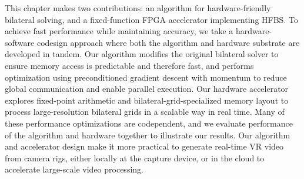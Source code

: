 This chapter makes two contributions: an algorithm for hardware-friendly bilateral solving, and a fixed-function FPGA accelerator implementing HFBS. 
To achieve fast performance while maintaining accuracy, we take a hardware-software codesign approach where both the algorithm and hardware substrate are developed in tandem.
Our algorithm modifies the original bilateral solver to ensure memory access is predictable and therefore fast, and performs optimization using preconditioned gradient descent with momentum to reduce global communication and enable parallel execution.
Our hardware accelerator explores fixed-point arithmetic and bilateral-grid-specialized memory layout to process large-resolution bilateral grids in a scalable way in real time. 
Many of these performance optimizations are codependent, and we evaluate performance of the algorithm and hardware together to illustrate our results.
Our algorithm and accelerator design make it more practical to generate real-time VR video from camera rigs, either locally at the capture device, or in the cloud to accelerate large-scale video processing.













